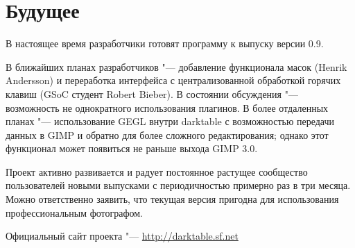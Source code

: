 \documentclass[10pt, a5paper]{article}
\begin{document}
\section*{Будущее}
В настоящее время разработчики готовят программу к выпуску версии 0.9. 

В ближайших планах разработчиков "--- добавление функционала масок (Henrik Andersson) и переработка интерфейса с централизованной обработкой горячих клавиш (GSoC студент Robert Bieber). В состоянии обсуждения "--- возможность не  однократного использования плагинов. В более отдаленных планах "--- использование GEGL внутри darktable с возможностью передачи данных в GIMP и обратно для более сложного редактирования; однако этот функционал может появиться не раньше выхода GIMP 3.0.

Проект активно развивается и радует постоянное растущее сообщество пользователей новыми выпусками с периодичностью примерно раз в три месяца. Можно ответственно заявить, что текущая версия пригодна для использования профессиональным фотографом.

\begin{thebibliography}{9}
 Официальный сайт проекта "--- \url{http://darktable.sf.net}
\end{thebibliography}
\end{document}
